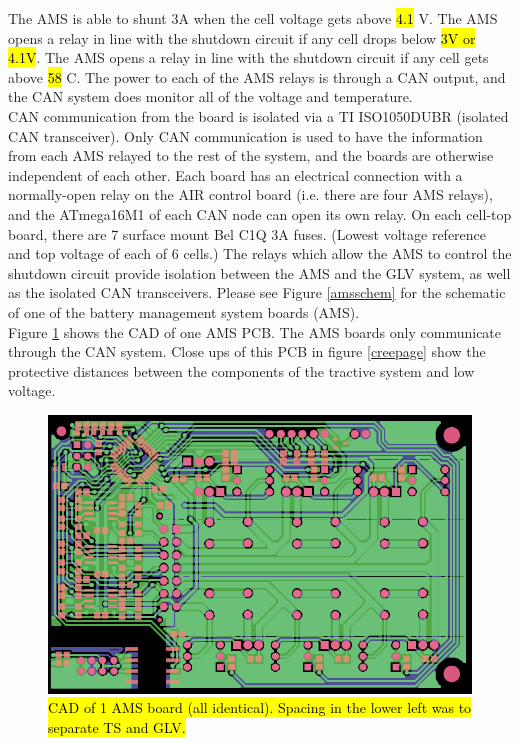 \documentclass{article}
\DeclareRobustCommand{\hlr}[1]{{\sethlcolor{red}\hl{#1}}}
\begin{document}
            The AMS is able to shunt 3A when the cell voltage gets above \hlr{4.1} V. The AMS opens a relay in line with the shutdown circuit if any cell drops below \hlr{3V or 4.1V}. The AMS opens a relay in line with the shutdown circuit if any cell gets above \hlr{58} \degree C. The power to each of the AMS relays is through a CAN output, and the CAN system does monitor all of the voltage and temperature.\\

            CAN communication from the board is isolated via a TI ISO1050DUBR (isolated CAN transceiver). Only CAN communication is used to have the information from each AMS relayed to the rest of the system, and the boards are otherwise independent of each other. Each board has an electrical connection with a normally-open relay on the AIR control board (i.e. there are four AMS relays), and the ATmega16M1 of each CAN node can open its own relay. On each cell-top board, there are 7 surface mount Bel C1Q 3A fuses. (Lowest voltage reference and top voltage of each of 6 cells.) The relays which allow the AMS to control the shutdown circuit provide isolation between the AMS and the GLV system, as well as the isolated CAN transceivers. Please see Figure \ref{amsschem} for the schematic of one of the battery management system boards (AMS).\\


            Figure \ref{bmspcb} shows the CAD of one AMS PCB. The AMS boards only communicate through the CAN system. Close ups of this PCB in figure \ref{creepage} show the protective distances between the components of the tractive system and low voltage.

            \begin{figure}[H]
                \centering
                \includegraphics[width = 0.7 \textwidth]{bmsfullgerber}
                \caption{\hlr{CAD of 1 AMS board (all identical). Spacing in the lower left was to separate TS and GLV.}}
                \label{bmspcb}
            \end{figure}
\end{document}
